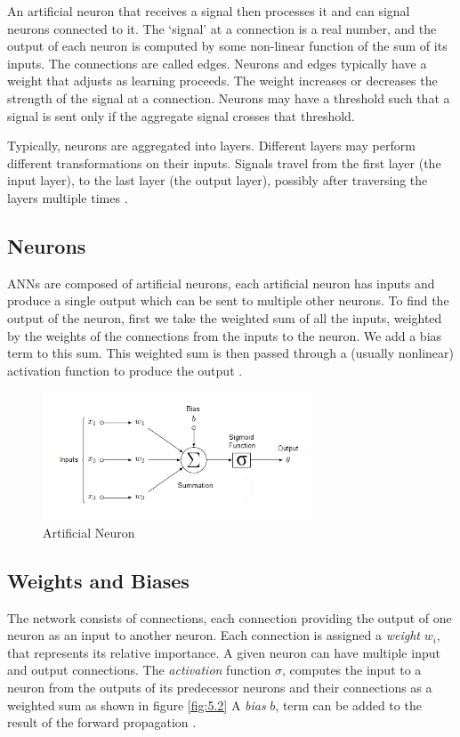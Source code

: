\documentclass[12pt, a4paper]{report}
\begin{document}
An artificial neuron that receives a signal then processes it and can signal neurons connected to it. The `signal' at a connection is a real number, and the output of each neuron is computed by some non-linear function of the sum of its inputs. The connections are called edges. Neurons and edges typically have a weight that adjusts as learning proceeds. The weight increases or decreases the strength of the signal at a connection. Neurons may have a threshold such that a signal is sent only if the aggregate signal crosses that threshold.

Typically, neurons are aggregated into layers. Different layers may perform different transformations on their inputs. Signals travel from the first layer (the input layer), to the last layer (the output layer), possibly after traversing the layers multiple times \cite{wiki:anns}.

\subsection{Neurons}
\label{subsec:neurons}
ANNs are composed of artificial neurons, each artificial neuron has inputs and produce a single output which can be sent to multiple other neurons. To find the output of the neuron, first we take the weighted sum of all the inputs, weighted by the weights of the connections from the inputs to the neuron. We add a bias term to this sum. This weighted sum is then passed through a (usually nonlinear) activation function to produce the output \cite{wiki:anns}.

\begin{figure}[!htbp]
    \centering
    \includegraphics[width=0.7\textwidth]{artificial_neuron.png}
    \caption[Artificial Neuron]{Artificial Neuron}
    \label{fig:5.2}
\end{figure}

\subsection{Weights and Biases}
The network consists of connections, each connection providing the output of one neuron as an input to another neuron. Each connection is assigned a \emph{weight} $w_i$, that represents its relative importance. A given neuron can have multiple input and output connections. The \emph{activation} function $\sigma$, computes the input to a neuron from the outputs of its predecessor neurons and their connections as a weighted sum as shown in figure \eqref{fig:5.2} A \emph{bias} $b$, term can be added to the result of the forward propagation \cite{wiki:anns}.
\end{document}
